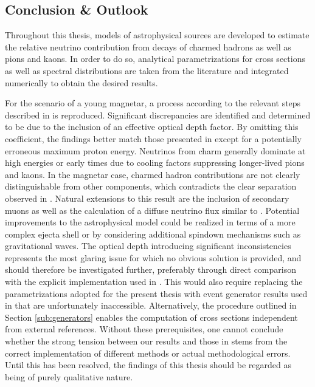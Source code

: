 \begin{spacing}{0.990}
	\chapter{Conclusion \& Outlook}
	\label{ch:conclusion}
	
	Throughout this thesis, models of astrophysical sources are developed to estimate the relative neutrino contribution from
	decays of charmed hadrons as well as pions and kaons. In order to do so, analytical parametrizations for cross sections as well as
	spectral distributions are taken from the literature and integrated numerically to obtain the desired results.
	
	For the scenario of a young magnetar, a process according to the relevant steps described in \cite{Carpio_2020} is reproduced. Significant
	discrepancies are identified and determined to be due to the inclusion of an effective optical depth factor. By omitting this coefficient,
	the findings better match those presented in \cite{Carpio_2020} except for a potentially erroneous maximum proton energy. Neutrinos
	from charm generally dominate at high energies or early times due to cooling factors suppressing longer-lived pions and kaons.
	In the magnetar case, charmed hadron contributions are not clearly distinguishable from other components, which contradicts
	the clear separation observed in \cite{Carpio_2020}. Natural extensions to this result are the inclusion of secondary muons as
	well as the calculation of a diffuse neutrino flux similar to \cite{Carpio_2020}. Potential improvements to the astrophysical model
	could be realized in terms of a more complex ejecta shell or by considering additional spindown mechanisms such as gravitational
	waves. The optical depth introducing significant inconsistencies represents the most glaring issue for which no obvious solution is
	provided, and should therefore be investigated further, preferably through direct comparison with the explicit implementation used in
	\cite{Carpio_2020}. This would also require replacing the parametrizations adopted for the present thesis with event
	generator results used in \cite{Carpio_2020} that are unfortunately inaccessible. Alternatively, the procedure
	outlined in Section \ref{sub:generators} enables the computation of cross sections independent from external references.
	Without these prerequisites, one cannot conclude whether the strong tension between our results and those in \cite{Carpio_2020}
	stems from the correct implementation of different methods or actual methodological errors. Until this has been resolved, the
	findings of this thesis should be regarded as being of purely qualitative nature.
	

\end{spacing}
